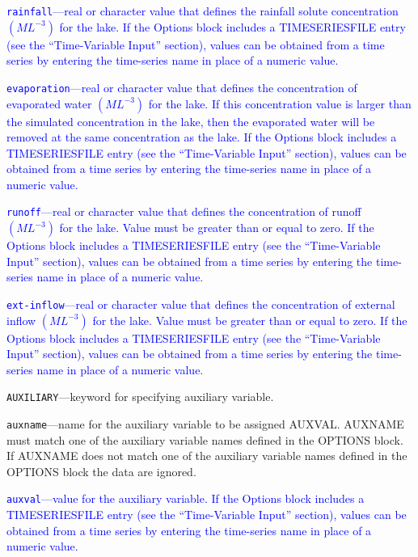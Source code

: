 \begin{description}
\item \textcolor{blue}{\texttt{rainfall}---real or character value that defines the rainfall solute concentration $(ML^{-3})$ for the lake. If the Options block includes a TIMESERIESFILE entry (see the ``Time-Variable Input'' section), values can be obtained from a time series by entering the time-series name in place of a numeric value.}

\item \textcolor{blue}{\texttt{evaporation}---real or character value that defines the concentration of evaporated water $(ML^{-3})$ for the lake. If this concentration value is larger than the simulated concentration in the lake, then the evaporated water will be removed at the same concentration as the lake.  If the Options block includes a TIMESERIESFILE entry (see the ``Time-Variable Input'' section), values can be obtained from a time series by entering the time-series name in place of a numeric value.}

\item \textcolor{blue}{\texttt{runoff}---real or character value that defines the concentration of runoff $(ML^{-3})$ for the lake. Value must be greater than or equal to zero. If the Options block includes a TIMESERIESFILE entry (see the ``Time-Variable Input'' section), values can be obtained from a time series by entering the time-series name in place of a numeric value.}

\item \textcolor{blue}{\texttt{ext-inflow}---real or character value that defines the concentration of external inflow $(ML^{-3})$ for the lake. Value must be greater than or equal to zero. If the Options block includes a TIMESERIESFILE entry (see the ``Time-Variable Input'' section), values can be obtained from a time series by entering the time-series name in place of a numeric value.}

\item \texttt{AUXILIARY}---keyword for specifying auxiliary variable.

\item \texttt{auxname}---name for the auxiliary variable to be assigned AUXVAL.  AUXNAME must match one of the auxiliary variable names defined in the OPTIONS block. If AUXNAME does not match one of the auxiliary variable names defined in the OPTIONS block the data are ignored.

\item \textcolor{blue}{\texttt{auxval}---value for the auxiliary variable. If the Options block includes a TIMESERIESFILE entry (see the ``Time-Variable Input'' section), values can be obtained from a time series by entering the time-series name in place of a numeric value.}

\end{description}

